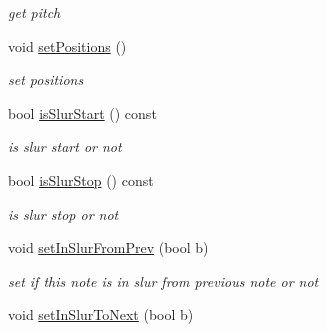 \begin{DoxyCompactItemize}
\begin{DoxyCompactList}\small\item\em get pitch \end{DoxyCompactList}\item 
\hypertarget{classsinsy_1_1NoteLabeler_a6ef98ccd80d5fda798c412c65cb18b5b}{void \hyperlink{classsinsy_1_1NoteLabeler_a6ef98ccd80d5fda798c412c65cb18b5b}{set\-Positions} ()}\label{classsinsy_1_1NoteLabeler_a6ef98ccd80d5fda798c412c65cb18b5b}

\begin{DoxyCompactList}\small\item\em set positions \end{DoxyCompactList}\item 
\hypertarget{classsinsy_1_1NoteLabeler_af656e318faf7d9afc078ae76dfd10445}{bool \hyperlink{classsinsy_1_1NoteLabeler_af656e318faf7d9afc078ae76dfd10445}{is\-Slur\-Start} () const }\label{classsinsy_1_1NoteLabeler_af656e318faf7d9afc078ae76dfd10445}

\begin{DoxyCompactList}\small\item\em is slur start or not \end{DoxyCompactList}\item 
\hypertarget{classsinsy_1_1NoteLabeler_a9be513c0e60fb53ff13c41fae804183c}{bool \hyperlink{classsinsy_1_1NoteLabeler_a9be513c0e60fb53ff13c41fae804183c}{is\-Slur\-Stop} () const }\label{classsinsy_1_1NoteLabeler_a9be513c0e60fb53ff13c41fae804183c}

\begin{DoxyCompactList}\small\item\em is slur stop or not \end{DoxyCompactList}\item 
\hypertarget{classsinsy_1_1NoteLabeler_a3ff27da70679310dd019fae2bc31eb44}{void \hyperlink{classsinsy_1_1NoteLabeler_a3ff27da70679310dd019fae2bc31eb44}{set\-In\-Slur\-From\-Prev} (bool b)}\label{classsinsy_1_1NoteLabeler_a3ff27da70679310dd019fae2bc31eb44}

\begin{DoxyCompactList}\small\item\em set if this note is in slur from previous note or not \end{DoxyCompactList}\item 
\hypertarget{classsinsy_1_1NoteLabeler_a0b132a68721cd55597515f050eb39596}{void \hyperlink{classsinsy_1_1NoteLabeler_a0b132a68721cd55597515f050eb39596}{set\-In\-Slur\-To\-Next} (bool b)}\label{classsinsy_1_1NoteLabeler_a0b132a68721cd55597515f050eb39596}


\end{DoxyCompactItemize}

